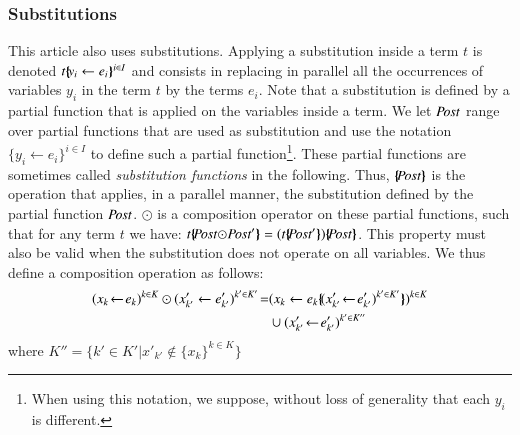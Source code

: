 \documentclass{elsarticle}
\newcommand{\TODO}[1]{\textcolor{red}{\textbf{[TODO:#1]}}}
\newcommand{\ERIC}[1]{\textcolor{blue}{#1}}
\newcommand{\LUDO}[1]{\textcolor{darkgreen}{#1}}
\newcommand{\shortotimes}{\!\otimes\!}
\newcommand{\shortodot}{\!\odot\!}
\begin{document}
\subsubsection*{Substitutions}
\label{def:substitutions}

This article also uses substitutions. Applying a substitution inside a term $t$ is denoted $t\{\hspace{-0.68ex}\{\!y_i\gets e_i\}\hspace{-0.67ex}\}^{i\in I}$ and consists in replacing in parallel all the occurrences of variables $y_i$ in the term $t$ by the terms $e_i$. Note that a substitution is defined by a partial function that is applied on the variables inside a term. We let $\Post$ range over partial functions that are used as substitution and use the notation $\{y_i\gets e_i\}^{i\in I}$ to define such a partial function\footnote{When using this notation, we suppose, without loss of generality that each $y_i$ is different.}. These partial functions are sometimes called \emph{substitution functions} in the following. Thus,
 $\subst{\Post}$ is  the operation that applies,  in a parallel manner,  the substitution defined by the partial function $\Post$. $\odot$ is a composition operator on these partial functions, such that for any term $t$ we have: $t\subst{\Post\shortodot\Post'} = (t\subst{\Post'})\subst{\Post}$.
This property must also be valid when the substitution does not operate on all variables.
We thus define a composition operation as follows: 
%
\begin{align*}
(x_{k}\!\gets\! e_{k})^{k\in K}\odot (x'_{k'}\gets e'_{k'})^{k'\in K'} \!=&  
(x_{k}\gets e_{k}\subst{(x'_{k'}\!\gets\! e'_{k'})^{k'\in K'}})^{k\in K} \\&\cup (x'_{k'}\!\gets\! e'_{k'})^{k'\in K''}
\end{align*}where $K''=\{k'\in K'|x'_{k'}\not\in\{x_k\}^{k\in K}\}$
%
\end{document}
